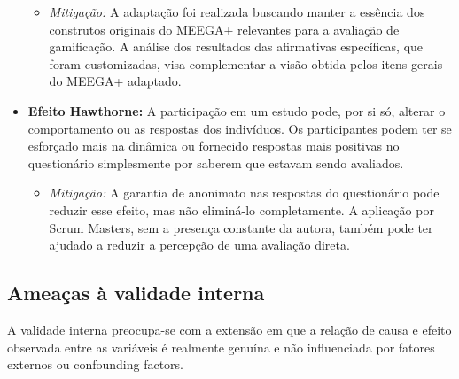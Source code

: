 \documentclass[
	12pt,
	openright,
	twoside,
	a4paper,
	english,
	brazil
	]{abntex2}
\begin{document}
\begin{itemize}
  \begin{itemize}
    \item \textit{Mitigação:} A adaptação foi realizada buscando manter a essência dos construtos originais do MEEGA+ relevantes para a avaliação de gamificação. A análise dos resultados das afirmativas específicas, que foram customizadas, visa complementar a visão obtida pelos itens gerais do MEEGA+ adaptado.
    \end{itemize}
  \item \textbf{Efeito Hawthorne:} A participação em um estudo pode, por si só, alterar o comportamento ou as respostas dos indivíduos. Os participantes podem ter se esforçado mais na dinâmica ou fornecido respostas mais positivas no questionário simplesmente por saberem que estavam sendo avaliados.
  \begin{itemize}
    \item \textit{Mitigação:} A garantia de anonimato nas respostas do questionário pode reduzir esse efeito, mas não eliminá-lo completamente. A aplicação por Scrum Masters, sem a presença constante da autora, também pode ter ajudado a reduzir a percepção de uma avaliação direta.
    \end{itemize}
\end{itemize}

\subsection{Ameaças à validade interna}
\label{sec:ameacas-interna}

A validade interna preocupa-se com a extensão em que a relação de causa e efeito observada entre as variáveis é realmente genuína e não influenciada por fatores externos ou confounding factors.
\end{document}
